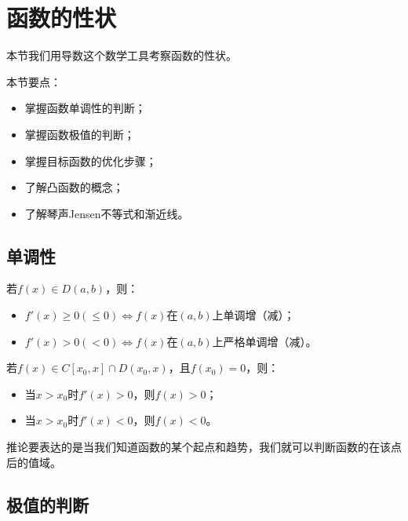 \section{函数的性状}

本节我们用导数这个数学工具考察函数的性状。

本节要点：
\begin{itemize}
    \item 掌握函数单调性的判断；
    \item 掌握函数极值的判断；
    \item 掌握目标函数的优化步骤；
    \item 了解凸函数的概念；
    \item 了解琴声Jensen不等式和渐近线。
\end{itemize}

\subsection{单调性}

\begin{theorem}
若$f\left( x \right) \in D\left( a,b \right) $，则：
\begin{itemize}
    \item $f'\left( x \right) \geqslant 0\left( \leqslant 0 \right) \Leftrightarrow f\left( x \right) $在$\left( a,b \right) $上单调增（减）；
    \item $f'\left( x \right) >0\left( <0 \right) \Leftrightarrow f\left( x \right) $在$\left( a,b \right) $上严格单调增（减）。
\end{itemize}
\end{theorem}

\begin{corollary}
若$f\left( x \right) \in C\left[ x_0,x \right] \cap D\left( x_0,x \right) $，且$f\left( x_0 \right) =0$，则：
\begin{itemize}
    \item 当$x>x_0$时$f'\left( x \right) >0$，则$f\left( x \right) >0$；
    \item 当$x>x_0$时$f'\left( x \right) <0$，则$f\left( x \right) <0$。
\end{itemize}
\end{corollary}

推论要表达的是当我们知道函数的某个起点和趋势，我们就可以判断函数的在该点后的值域。

\subsection{极值的判断}

